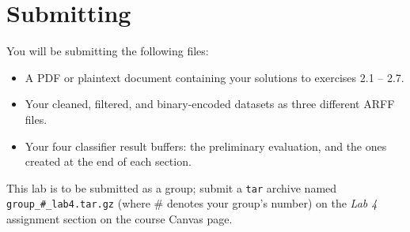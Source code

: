 \documentclass[11pt]{cselabheader}
\begin{document}
\pagebreak

\section{Submitting}

You will be submitting the following files:

\begin{itemize}
  \item A PDF or plaintext document containing your solutions to exercises 2.1 -- 2.7.
  \item Your cleaned, filtered, and binary-encoded datasets as three different ARFF files.
  \item Your four classifier result buffers: the preliminary evaluation, and the ones created at the end of each section.
\end{itemize}

 This lab is to be submitted as a group; submit a \texttt{tar} archive named \texttt{group\_\#\_lab4.tar.gz} (where \# denotes your group's number) on the \emph{Lab 4} assignment section on the course Canvas page.
\end{document}
